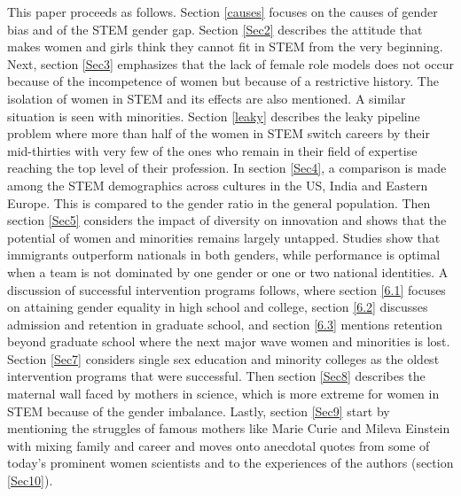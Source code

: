 \documentclass[utf8]{frontiersSCNS} %
\begin{document}
This paper proceeds as follows. Section \ref{causes} focuses on the causes of gender bias and of the STEM gender gap. Section \ref{Sec2} describes the attitude that makes women and girls think they cannot fit in STEM from the very beginning. Next, section \ref{Sec3} emphasizes that the lack of female role models does not occur because of the incompetence of women but because of a restrictive history. The isolation of women in STEM and its effects are also mentioned. A similar situation is seen with minorities. Section \ref{leaky} describes the leaky pipeline problem where more than half of the women in STEM switch careers by their mid-thirties with very few of the ones who remain in their field of expertise reaching the top level of their profession. In section \ref{Sec4}, a comparison is made among the STEM demographics across cultures in the US, India and Eastern Europe.  This is compared to the gender ratio in the general population. Then section \ref{Sec5} considers the impact of diversity on innovation and shows that the potential of women and minorities remains largely untapped. Studies show that immigrants outperform nationals in both genders, while performance is optimal when a team is not dominated by one gender or one or two national identities. A discussion of successful intervention programs follows, where section \ref{6.1} focuses on attaining gender equality in high school and college, section \ref{6.2} discusses admission and retention in graduate school, and section \ref{6.3} mentions retention beyond graduate school where the next major wave women and minorities is lost. Section \ref{Sec7} considers single sex education and minority colleges as the oldest intervention programs that were successful. Then section \ref{Sec8} describes the maternal wall faced by mothers in science, which is more extreme for women in STEM because of the gender imbalance. Lastly, section \ref{Sec9} start by mentioning the struggles of famous mothers like Marie Curie and Mileva Einstein with mixing family and career and moves onto anecdotal quotes from some of today's prominent women scientists and to the experiences of the authors (section \ref{Sec10}).
\end{document}
